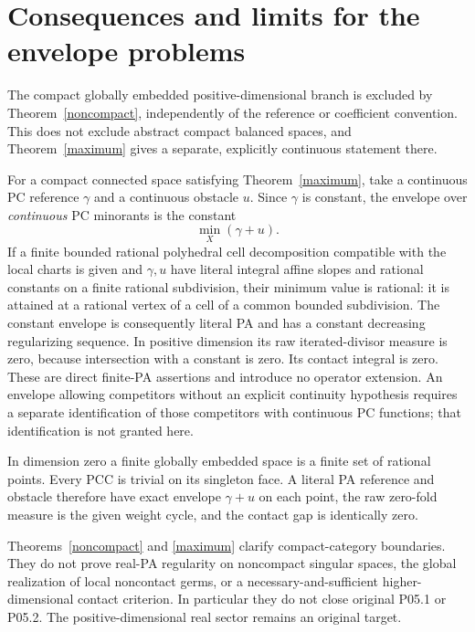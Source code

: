 \documentclass[11pt]{article}
\begin{document}
\section{Consequences and limits for the envelope problems}
The compact globally embedded positive-dimensional branch is excluded by Theorem~\ref{noncompact}, independently of the reference or coefficient convention. This does not exclude abstract compact balanced spaces, and Theorem~\ref{maximum} gives a separate, explicitly continuous statement there.

For a compact connected space satisfying Theorem~\ref{maximum}, take a continuous PC reference $\gamma$ and a continuous obstacle $u$. Since $\gamma$ is constant, the envelope over \emph{continuous} PC minorants is the constant
\[\min_X(\gamma+u).
\]
If a finite bounded rational polyhedral cell decomposition compatible with the local charts is given and $\gamma,u$ have literal integral affine slopes and rational constants on a finite rational subdivision, their minimum value is rational: it is attained at a rational vertex of a cell of a common bounded subdivision. The constant envelope is consequently literal PA and has a constant decreasing regularizing sequence. In positive dimension its raw iterated-divisor measure is zero, because intersection with a constant is zero. Its contact integral is zero. These are direct finite-PA assertions and introduce no operator extension. An envelope allowing competitors without an explicit continuity hypothesis requires a separate identification of those competitors with continuous PC functions; that identification is not granted here.

In dimension zero a finite globally embedded space is a finite set of rational points. Every PCC is trivial on its singleton face. A literal PA reference and obstacle therefore have exact envelope $\gamma+u$ on each point, the raw zero-fold measure is the given weight cycle, and the contact gap is identically zero.

Theorems~\ref{noncompact} and \ref{maximum} clarify compact-category boundaries. They do not prove real-PA regularity on noncompact singular spaces, the global realization of local noncontact germs, or a necessary-and-sufficient higher-dimensional contact criterion. In particular they do not close original P05.1 or P05.2. The positive-dimensional real sector remains an original target.

\appendix
\end{document}
